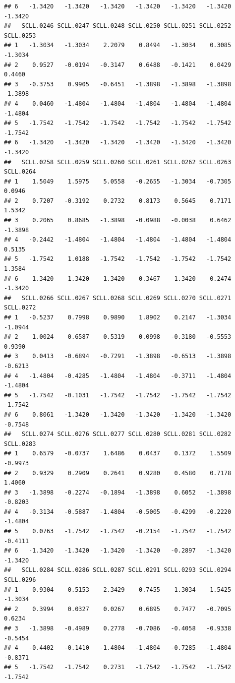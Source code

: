 \documentclass[
]{article}
\begin{document}
\begin{verbatim}
## 6   -1.3420   -1.3420   -1.3420   -1.3420   -1.3420   -1.3420   -1.3420
##   SCLL.0246 SCLL.0247 SCLL.0248 SCLL.0250 SCLL.0251 SCLL.0252 SCLL.0253
## 1   -1.3034   -1.3034    2.2079    0.8494   -1.3034    0.3085   -1.3034
## 2    0.9527   -0.0194   -0.3147    0.6488   -0.1421    0.0429    0.4460
## 3   -0.3753    0.9905   -0.6451   -1.3898   -1.3898   -1.3898   -1.3898
## 4    0.0460   -1.4804   -1.4804   -1.4804   -1.4804   -1.4804   -1.4804
## 5   -1.7542   -1.7542   -1.7542   -1.7542   -1.7542   -1.7542   -1.7542
## 6   -1.3420   -1.3420   -1.3420   -1.3420   -1.3420   -1.3420   -1.3420
##   SCLL.0258 SCLL.0259 SCLL.0260 SCLL.0261 SCLL.0262 SCLL.0263 SCLL.0264
## 1    1.5049    1.5975    5.0558   -0.2655   -1.3034   -0.7305    0.0946
## 2    0.7207   -0.3192    0.2732    0.8173    0.5645    0.7171    1.5342
## 3    0.2065    0.8685   -1.3898   -0.0988   -0.0038    0.6462   -1.3898
## 4   -0.2442   -1.4804   -1.4804   -1.4804   -1.4804   -1.4804    0.5135
## 5   -1.7542    1.0188   -1.7542   -1.7542   -1.7542   -1.7542    1.3584
## 6   -1.3420   -1.3420   -1.3420   -0.3467   -1.3420    0.2474   -1.3420
##   SCLL.0266 SCLL.0267 SCLL.0268 SCLL.0269 SCLL.0270 SCLL.0271 SCLL.0272
## 1   -0.5237    0.7998    0.9890    1.8902    0.2147   -1.3034   -1.0944
## 2    1.0024    0.6587    0.5319    0.0998   -0.3180   -0.5553    0.9390
## 3    0.0413   -0.6894   -0.7291   -1.3898   -0.6513   -1.3898   -0.6213
## 4   -1.4804   -0.4285   -1.4804   -1.4804   -0.3711   -1.4804   -1.4804
## 5   -1.7542   -0.1031   -1.7542   -1.7542   -1.7542   -1.7542   -1.7542
## 6    0.8061   -1.3420   -1.3420   -1.3420   -1.3420   -1.3420   -0.7548
##   SCLL.0274 SCLL.0276 SCLL.0277 SCLL.0280 SCLL.0281 SCLL.0282 SCLL.0283
## 1    0.6579   -0.0737    1.6486    0.0437    0.1372    1.5509   -0.9973
## 2    0.9329    0.2909    0.2641    0.9280    0.4580    0.7178    1.4060
## 3   -1.3898   -0.2274   -0.1894   -1.3898    0.6052   -1.3898   -0.8203
## 4   -0.3134   -0.5887   -1.4804   -0.5005   -0.4299   -0.2220   -1.4804
## 5    0.0763   -1.7542   -1.7542   -0.2154   -1.7542   -1.7542   -0.4111
## 6   -1.3420   -1.3420   -1.3420   -1.3420   -0.2897   -1.3420   -1.3420
##   SCLL.0284 SCLL.0286 SCLL.0287 SCLL.0291 SCLL.0293 SCLL.0294 SCLL.0296
## 1   -0.9304    0.5153    2.3429    0.7455   -1.3034    1.5425   -1.3034
## 2    0.3994    0.0327    0.0267    0.6895    0.7477   -0.7095    0.6234
## 3   -1.3898   -0.4989    0.2778   -0.7086   -0.4058   -0.9338   -0.5454
## 4   -0.4402   -0.1410   -1.4804   -1.4804   -0.7285   -1.4804   -0.8371
## 5   -1.7542   -1.7542    0.2731   -1.7542   -1.7542   -1.7542   -1.7542

\end{verbatim}
\end{document}

